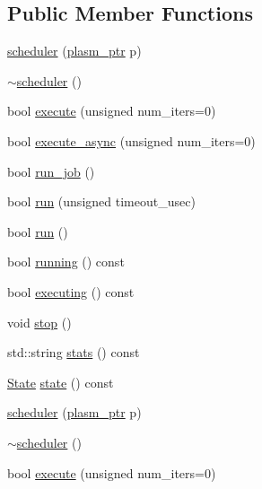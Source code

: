 \subsection*{Public Member Functions}
\begin{DoxyCompactItemize}
\item 
\hyperlink{classecto_1_1scheduler_a3a2999bde52bfacfc194243ef2ae4f89}{scheduler} (\hyperlink{namespaceecto_a6b83be6cd685db71f03b14871653475f}{plasm\-\_\-ptr} p)
\item 
\hyperlink{classecto_1_1scheduler_aac758e34705ebab32cf66bdf42f0d89d}{$\sim$scheduler} ()
\item 
bool \hyperlink{classecto_1_1scheduler_ad917e3fa322f0a065e306afec7284d4e}{execute} (unsigned num\-\_\-iters=0)
\item 
bool \hyperlink{classecto_1_1scheduler_a2e9982c19e57c9e578d2f8f54c24dc1a}{execute\-\_\-async} (unsigned num\-\_\-iters=0)
\item 
bool \hyperlink{classecto_1_1scheduler_a7fcfe7583c13ff5d2294242aedfa0b1a}{run\-\_\-job} ()
\item 
bool \hyperlink{classecto_1_1scheduler_a326022cba6c3154f28f9694b7c9968fd}{run} (unsigned timeout\-\_\-usec)
\item 
bool \hyperlink{classecto_1_1scheduler_a8d5ce4f97e511341f315bb7621ba38f4}{run} ()
\item 
bool \hyperlink{classecto_1_1scheduler_a99ac4b8df3d015f6a39d0cf7607cc657}{running} () const 
\item 
bool \hyperlink{classecto_1_1scheduler_a13257817e1cc6c1ce04ef0bfdabc5375}{executing} () const 
\item 
void \hyperlink{classecto_1_1scheduler_ab974783264da5c33a19110926b5565f4}{stop} ()
\item 
std\-::string \hyperlink{classecto_1_1scheduler_a99d2f51779f856b3905bb8b493f091c4}{stats} () const 
\item 
\hyperlink{classecto_1_1scheduler_a6b063d1c4bb9dad58d7ace61946b1200}{State} \hyperlink{classecto_1_1scheduler_a5497ae108416ccdf7d80fa7c8e462992}{state} () const 
\item 
\hyperlink{classecto_1_1scheduler_a3a2999bde52bfacfc194243ef2ae4f89}{scheduler} (\hyperlink{namespaceecto_a6b83be6cd685db71f03b14871653475f}{plasm\-\_\-ptr} p)
\item 
\hyperlink{classecto_1_1scheduler_aac758e34705ebab32cf66bdf42f0d89d}{$\sim$scheduler} ()
\item 
bool \hyperlink{classecto_1_1scheduler_ad917e3fa322f0a065e306afec7284d4e}{execute} (unsigned num\-\_\-iters=0)

\end{DoxyCompactItemize}
